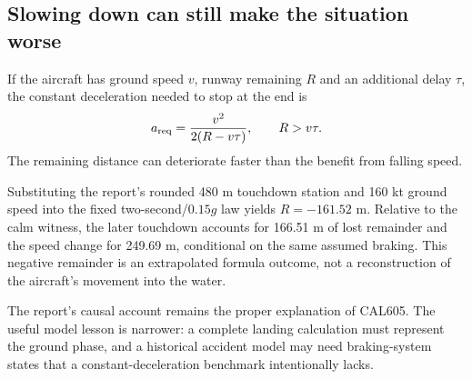 \subsection*{Slowing down can still make the situation worse}
If the aircraft has ground speed $v$, runway remaining $R$ and an additional delay $\tau$, the constant deceleration needed to stop at the end is
\begin{equation}
a_{\rm req}=\frac{v^2}{2(R-v\tau)},\qquad R>v\tau.
\label{eq:required}
\end{equation}
The remaining distance can deteriorate faster than the benefit from falling speed.



Substituting the report's rounded 480 m touchdown station and 160 kt ground speed into the fixed two-second/$0.15g$ law yields $R=-161.52$ m. Relative to the calm witness, the later touchdown accounts for 166.51 m of lost remainder and the speed change for 249.69 m, conditional on the same assumed braking. This negative remainder is an extrapolated formula outcome, not a reconstruction of the aircraft's movement into the water.

The report's causal account remains the proper explanation of CAL605. The useful model lesson is narrower: a complete landing calculation must represent the ground phase, and a historical accident model may need braking-system states that a constant-deceleration benchmark intentionally lacks.
\par\medskip
